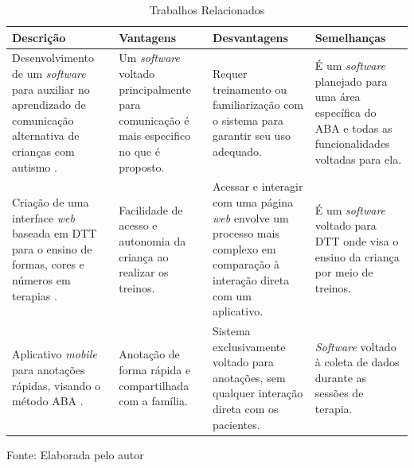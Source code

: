 \begin{table}[h]
    \caption{Trabalhos Relacionados}
    \centering
    \begin{tabular}{|p{4cm}|p{3.40cm}|p{3.40cm}|p{3.40cm}|}
    \hline
    \textbf{Descrição} & \textbf{Vantagens} & \textbf{Desvantagens} & \textbf{Semelhanças} \\
    \hline
        Desenvolvimento de um \textit{software} para auxiliar no aprendizado de comunicação alternativa de crianças com autismo \cite{artoni2011accessible}. 
        &
        Um \textit{software} voltado principalmente para comunicação é mais especifico no que é proposto.
        &
        Requer treinamento ou familiarização com o sistema para garantir seu uso adequado.
        &
        É um \textit{software} planejado para uma área específica do ABA e todas as funcionalidades voltadas para ela.
        \\
    \hline
        Criação de uma interface \textit{web} baseada em DTT para o ensino de formas, cores e números em terapias \cite{artoni2012designing}. &
        Facilidade de acesso e autonomia da criança ao realizar os treinos. &
        Acessar e interagir com uma página \textit{web} envolve um processo mais complexo em comparação à interação direta com um aplicativo. &
        É um \textit{software} voltado para DTT onde visa o ensino da criança por meio de treinos. \\
    \hline
        Aplicativo \textit{mobile} para anotações rápidas, visando o método ABA \cite{artoni2013portable}. &
        Anotação de forma rápida e compartilhada com a família. &
        Sistema exclusivamente voltado para anotações, sem qualquer interação direta com os pacientes. &
        \textit{Software} voltado à coleta de dados durante as sessões de terapia. \\
    \hline
    \end{tabular}
    \label{tab:trabalhos-relacionados}
    {
        Fonte: Elaborada pelo autor
    }
\end{table}
